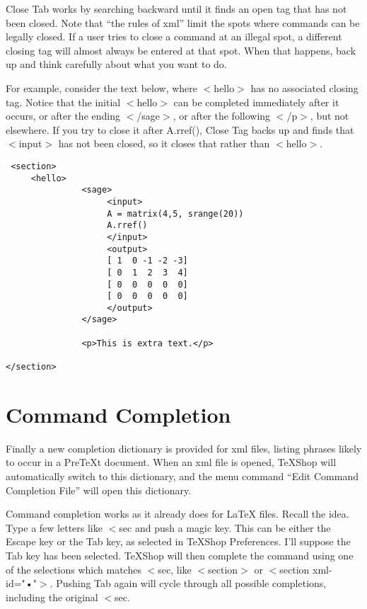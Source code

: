 \documentclass[11pt, oneside]{article}   	%
\begin{document}
Close Tab works by searching backward until it finds an open tag that has not been closed. Note that ``the rules of xml'' limit the spots where commands can be legally closed. If a user tries to close a command at an illegal spot, a different closing tag will almost always be entered at that spot. When that happens, back up and think carefully about what you want to do.

 For example, consider the text below, where $<$hello$>$ has no associated closing tag.
 Notice that the initial $<$hello$>$ can be completed immediately after it occurs, or after the ending $<$/sage$>$, or after the following $<$/p$>$, but not elsewhere. If you try to close it after A.rref(), Close Tag backs up and finds that $<$input$>$ has not been closed, so it closes that rather than $<$hello$>$.
  

 \begin{verbatim}
 <section>
     <hello>
               <sage>
                    <input>
                    A = matrix(4,5, srange(20))
                    A.rref()
                    </input>
                    <output>
                    [ 1  0 -1 -2 -3]
                    [ 0  1  2  3  4]
                    [ 0  0  0  0  0]
                    [ 0  0  0  0  0]
                    </output>
               </sage>
            
               <p>This is extra text.</p>
            
</section>
\end{verbatim}

\section{Command Completion}

Finally a new completion dictionary is provided for xml files, listing phrases likely to occur in a PreTeXt document. When an xml file is opened, TeXShop will automatically switch to this dictionary, and the menu command ``Edit Command Completion File'' will open this dictionary. 
 
Command completion works as it already does for LaTeX files. Recall the idea. Type a few letters like
$<$sec and push a magic key. This can be either the Escape key or the Tab key, as selected in TeXShop Preferences. I'll suppose the Tab key has been selected. TeXShop will then complete the command using one of the selections which matches $<$sec, like $<$section$>$ or $<$section xml-id="•"$>$. Pushing Tab again will cycle through all possible completions, including the original $<$sec. 
\end{document}
